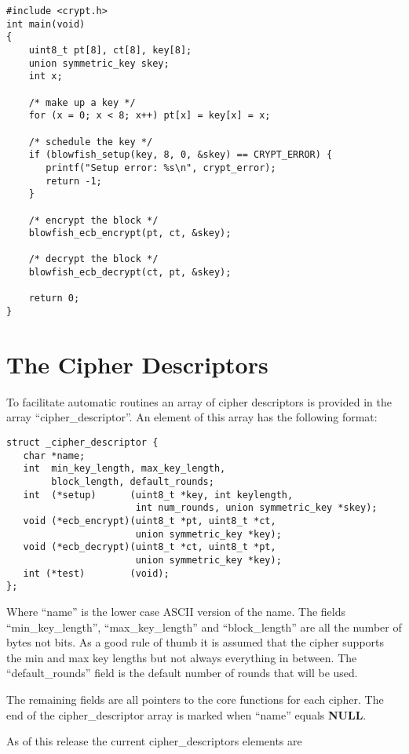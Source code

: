 \documentclass{book}
\begin{document}
\begin{verbatim}
#include <crypt.h>
int main(void)
{ 
    uint8_t pt[8], ct[8], key[8];
    union symmetric_key skey;
    int x;

    /* make up a key */
    for (x = 0; x < 8; x++) pt[x] = key[x] = x;

    /* schedule the key */
    if (blowfish_setup(key, 8, 0, &skey) == CRYPT_ERROR) {
       printf("Setup error: %s\n", crypt_error);
       return -1;
    }    

    /* encrypt the block */
    blowfish_ecb_encrypt(pt, ct, &skey);
 
    /* decrypt the block */
    blowfish_ecb_decrypt(ct, pt, &skey);

    return 0;
}
\end{verbatim}

\section{The Cipher Descriptors}

To facilitate automatic routines an array of cipher descriptors is provided in the array ``cipher\_descriptor''.  An element
of this array has the following format:

\begin{verbatim}
struct _cipher_descriptor {
   char *name;
   int  min_key_length, max_key_length, 
        block_length, default_rounds;
   int  (*setup)      (uint8_t *key, int keylength, 
                       int num_rounds, union symmetric_key *skey);
   void (*ecb_encrypt)(uint8_t *pt, uint8_t *ct, 
                       union symmetric_key *key);
   void (*ecb_decrypt)(uint8_t *ct, uint8_t *pt, 
                       union symmetric_key *key);
   int (*test)        (void);
};
\end{verbatim}

Where ``name'' is the lower case ASCII version of the name.  The fields ``min\_key\_length'', ``max\_key\_length'' and
``block\_length'' are all the number of bytes not bits.  As a good rule of thumb it is assumed that the cipher supports
the min and max key lengths but not always everything in between.  The ``default\_rounds'' field is the default number
of rounds that will be used.

The remaining fields are all pointers to the core functions for each cipher.  The end of the cipher\_descriptor array is
marked when ``name'' equals {\bf NULL}.

As of this release the current cipher\_descriptors elements are
\end{document}
